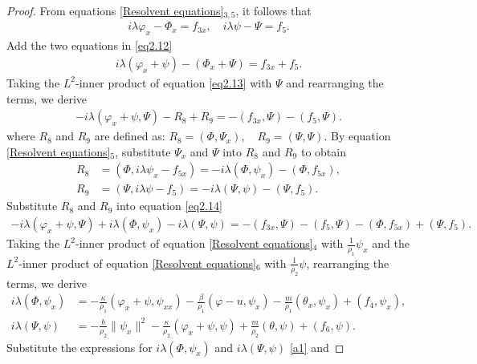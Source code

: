 \documentclass[11pt,reqno]{article}
\begin{document}
  \begin{proof}
  	From equations \eqref{Resolvent equations}$_{3,5}$, it follows that
  	\begin{align}\label{eq2.12}
  		i \lambda \varphi_x - \Phi_x = f_{3x}, \quad i \lambda \psi - \Psi = f_5.
  	\end{align}
  	Add the two equations in \eqref{eq2.12}
  	\begin{align}\label{eq2.13}
  		i \lambda (\varphi_x + \psi) - (\Phi_x + \Psi) = f_{3 x} + f_5.
  	\end{align}
  	Taking the $L^2$-inner product of equation \eqref{eq2.13} with $\Psi$ and rearranging the terms, we derive
  	\begin{align}\label{eq2.14}
  		-i \lambda (\varphi_x + \psi, \Psi) - R_8 + R_9 = -(f_{3 x}, \Psi) - (f_5, \Psi).
  	\end{align}
  	where $R_8$ and $R_9$ are defined as:	$R_8 = (\Phi, \Psi_x), \quad R_9 = (\Psi, \Psi)$.
  	By equation \eqref{Resolvent equations}$_5$, substitute $\Psi_x$ and $\Psi$ into $R_8$ and $R_9$ to obtain
  	\begin{align*}
  		R_8 &= (\Phi, i \lambda \psi_x - f_{5 x}) = -i \lambda (\Phi, \psi_x) - (\Phi, f_{5 x}), \\
  		R_9 &= (\Psi, i \lambda \psi - f_5) = -i \lambda (\Psi, \psi) - (\Psi, f_5).
  	\end{align*}
  	Substitute $R_8$ and $R_9$ into equation \eqref{eq2.14}
  	\begin{align}\label{eq2.15}
  		-i \lambda (\varphi_x + \psi, \Psi) + i \lambda (\Phi, \psi_x)   -i \lambda (\Psi, \psi)  = -(f_{3 x}, \Psi) - (f_5, \Psi) - (\Phi, f_{5 x}) + (\Psi, f_5).
  	\end{align}
  	Taking the $L^2$-inner product of equation \eqref{Resolvent equations}$_4$ with $\frac{1}{\rho_1}\psi_x$ and the $L^2$-inner product of equation \eqref{Resolvent equations}$_6$ with $\frac{1}{\rho_2}\psi$, rearranging the terms, we derive
  	\begin{align}
  		i\lambda(\Phi,\psi_{x}) &= -\frac{\kappa}{\rho_{1}}(\varphi_{x} + \psi, \psi_{xx}) - \frac{\beta}{\rho_{1}}(\varphi - u, \psi_{x}) - \frac{m}{\rho_{1}}(\theta_{x}, \psi_{x}) + (f_{4}, \psi_{x}), \label{a1}\\
  		i\lambda(\Psi,\psi) &= -\frac{b}{\rho_{2}}\|\psi_{x}\|^{2} - \frac{\kappa}{\rho_{2}}(\varphi_{x} + \psi, \psi) + \frac{m}{\rho_{2}}(\theta, \psi) + (f_{6}, \psi). \label{a2}
  	\end{align}
  	Substitute the expressions for $i\lambda(\Phi,\psi_{x})$ and $i\lambda(\Psi,\psi)$ \eqref{a1} and

\end{proof}
\end{document}
